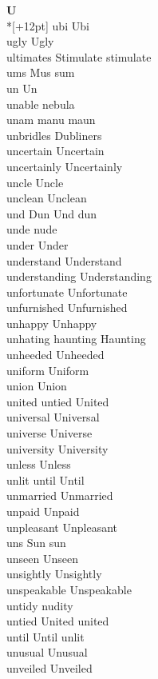\vspace{14pt}
\noindent\textbf{\Large U}\\*[+12pt]
ubi Ubi\\
ugly Ugly\\
ultimates Stimulate stimulate\\
ums Mus sum\\
un Un\\
unable nebula\\
unam manu maun\\
unbridles Dubliners\\
uncertain Uncertain\\
uncertainly Uncertainly\\
uncle Uncle\\
unclean Unclean\\
und Dun Und dun\\
unde nude\\
under Under\\
understand Understand\\
understanding Understanding\\
unfortunate Unfortunate\\
unfurnished Unfurnished\\
unhappy Unhappy\\
unhating haunting Haunting\\
unheeded Unheeded\\
uniform Uniform\\
union Union\\
united untied United\\
universal Universal\\
universe Universe\\
university University\\
unless Unless\\
unlit until Until\\
unmarried Unmarried\\
unpaid Unpaid\\
unpleasant Unpleasant\\
uns Sun sun\\
unseen Unseen\\
unsightly Unsightly\\
unspeakable Unspeakable\\
untidy nudity\\
untied United united\\
until Until unlit\\
unusual Unusual\\
unveiled Unveiled\\
